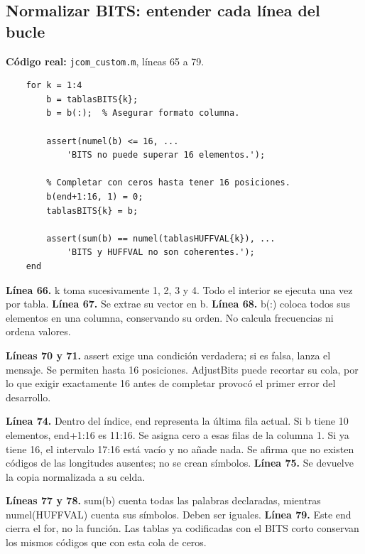 \documentclass[11pt,a4paper,oneside]{report}
\begin{document}
\par\medskip\noindent\begin{minipage}{\linewidth}

\subsection{Normalizar BITS: entender cada línea del bucle}

\textbf{Código real:} \texttt{jcom\_custom.m}, líneas 65 a 79.

\begin{lstlisting}[firstnumber=65]
    % Comprobar y completar las especificaciones.
    for k = 1:4
        b = tablasBITS{k};
        b = b(:);  % Asegurar formato columna.

        assert(numel(b) <= 16, ...
            'BITS no puede superar 16 elementos.');

        % Completar con ceros hasta tener 16 posiciones.
        b(end+1:16, 1) = 0;
        tablasBITS{k} = b;

        assert(sum(b) == numel(tablasHUFFVAL{k}), ...
            'BITS y HUFFVAL no son coherentes.');
    end
\end{lstlisting}

\end{minipage}\par


\textbf{Línea 66.} k toma sucesivamente 1, 2, 3 y 4. Todo el interior se
ejecuta una vez por tabla. \textbf{Línea 67.} Se extrae su vector en b.
\textbf{Línea 68.} b(:) coloca todos sus elementos en una columna, conservando
su orden. No calcula frecuencias ni ordena valores.

\textbf{Líneas 70 y 71.} assert exige una condición verdadera; si es falsa,
lanza el mensaje. Se permiten hasta 16 posiciones. AdjustBits puede recortar
su cola, por lo que exigir exactamente 16 antes de completar provocó el
primer error del desarrollo.

\textbf{Línea 74.} Dentro del índice, end representa la última fila actual.
Si b tiene 10 elementos, end+1:16 es 11:16. Se asigna cero a esas filas de
la columna 1. Si ya tiene 16, el intervalo 17:16 está vacío y no añade nada.
Se afirma que no existen códigos de las longitudes ausentes; no se crean
símbolos. \textbf{Línea 75.} Se devuelve la copia normalizada a su celda.

\textbf{Líneas 77 y 78.} sum(b) cuenta todas las palabras declaradas, mientras
numel(HUFFVAL) cuenta sus símbolos. Deben ser iguales. \textbf{Línea 79.}
Este end cierra el for, no la función. Las tablas ya codificadas con el BITS
corto conservan los mismos códigos que con esta cola de ceros.
\end{document}
